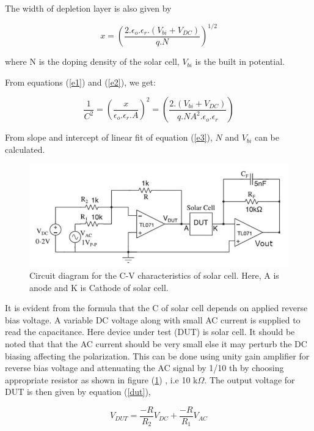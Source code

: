 \documentclass[a4paper, amsfonts, amssymb, amsmath, reprint, showkeys, nofootinbib, twoside]{revtex4-1}
\begin{document}
The width of depletion layer is also given by 

\begin{equation}\label{e2}
	x=\left(\frac{2.\epsilon_o.\epsilon_r.(V_{bi}+V_{DC})}{q.N}\right) ^{1/2}
\end{equation}

where N is the doping density of the solar cell, $V_{bi}$ is the built in potential. 

From equations (\ref{e1}) and (\ref{e2}), we get:

\begin{equation}\label{e3}
	\frac{1}{C^2}=\left(\frac{x}{\epsilon_o.\epsilon_r.A}\right)^{2} =\left(\frac{2.(V_{bi}+V_{DC})}{q.NA^2.\epsilon_o.\epsilon_r}\right) 
\end{equation}

From slope and intercept of linear fit of equation (\ref{e3}), $N$ and $V_{bi}$ can be calculated.

\begin{figure}[H]
	\centering
	\includegraphics[scale=0.3]{1} 
	\caption{Circuit diagram for the C-V characteristics of solar cell. Here, A is anode and K is Cathode of solar cell.}
	\label{1}
\end{figure}

It is evident from the formula that the C of solar cell depends on applied reverse bias voltage. A variable DC voltage along with small AC current is supplied to read the capacitance. Here device under test (DUT) is solar cell. It should be noted that that the AC current should be very small else it may perturb the DC biasing affecting the polarization. This can be done using unity gain amplifier for reverse bias voltage and attenuating the AC signal by 1/10 th by choosing appropriate resistor as shown in figure (\ref{1}) , i.e 10 k$\Omega$. The output voltage for DUT is then given by equation (\ref{dut}),

\begin{equation}\label{dut}
	V_{DUT}=\frac{-R}{R_2}V_{DC}+\frac{-R}{R_1}V_{AC}
\end{equation}
\end{document}
